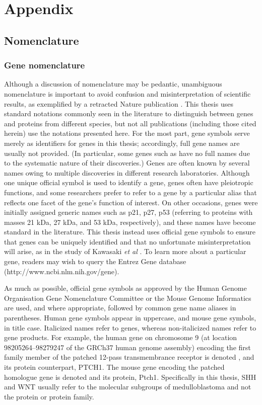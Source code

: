\chapter{Appendix}
\label{ch:appendix}

\section{Nomenclature}
\label{sec:nomenclature}

\subsection{Gene nomenclature}

Although a discussion of nomenclature may be pedantic, unambiguous nomenclature is important to avoid confusion and misinterpretation of scientific results, as exemplified by a retracted Nature publication . This thesis uses standard notations commonly seen in the literature to distinguish between genes and proteins from different species, but not all publications (including those cited herein) use the notations presented here. For the most part, gene symbols serve merely as identifiers for genes in this thesis; accordingly, full gene names are usually not provided. (In particular, some genes such as  have no full names due to the systematic nature of their discoveries.) Genes are often known by several names owing to multiple discoveries in different research laboratories. Although one unique official symbol is used to identify a gene, genes often have pleiotropic functions, and some researchers prefer to refer to a gene by a particular alias that reflects one facet of the gene's function of interest. On other occasions, genes were initially assigned generic names such as p21, p27, p53 (referring to proteins with masses 21 kDa, 27 kDa, and 53 kDa, respectively), and these names have become standard in the literature. This thesis instead uses official gene symbols to ensure that genes can be uniquely identified and that no unfortunate misinterpretation will arise, as in the study of Kawasaki \emph{et al} . To learn more about a particular gene, readers may wish to query the Entrez Gene database ({http://www.ncbi.nlm.nih.gov/gene}).

As much as possible, official gene symbols as approved by the Human Genome Organisation Gene Nomenclature Committee or the Mouse Genome Informatics are used, and where appropriate, followed by common gene name aliases in parentheses. Human gene symbols appear in uppercase, and mouse gene symbols, in title case. Italicized names refer to genes, whereas non-italicized names refer to gene products. For example, the human gene on chromosome 9 (at location 98205264--98279247 of the GRCh37 human genome assembly) encoding the first family member of the patched 12-pass transmembrance receptor is denoted , and its protein counterpart, PTCH1. The mouse gene encoding the patched homologue gene is denoted  and its protein, Ptch1. Specifically in this thesis, SHH and WNT usually refer to the molecular subgroups of medulloblastoma and not the protein or protein family.

